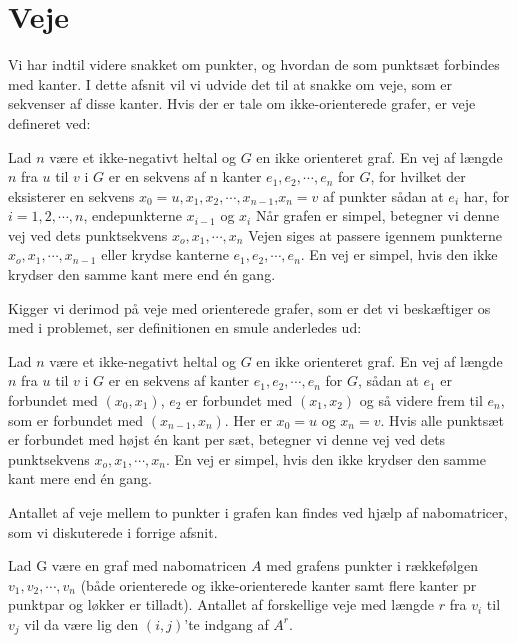 \section{Veje}
Vi har indtil videre snakket om punkter, og hvordan de som punktsæt forbindes med kanter. I dette afsnit vil vi udvide det til at snakke om veje, som er sekvenser af disse kanter. Hvis der er tale om ikke-orienterede grafer, er veje defineret ved:
\begin{defn}
[Veje] 
Lad $n$ være et ikke-negativt heltal og $G$ en ikke orienteret graf. En vej af længde $n$ fra $u$ til $v$ i $G$ er en sekvens af n kanter $e_{1},e_{2},\cdots,e_{n}$ for $G$, for hvilket der eksisterer en sekvens $x_{0}=u,x_{1},x_{2},\cdots,x_{n-1}$,$x_{n}=v$ af punkter sådan at $e_{i}$ har, for $i=1,2,\cdots,n$, endepunkterne $x_{i-1}$ og $x_{i}$ Når grafen er simpel, betegner vi denne  vej ved dets punktsekvens $x_{o},x_{1},\cdots,x_{n}$ Vejen siges at passere igennem punkterne $x_{o},x_{1},\cdots,x_{n-1}$ eller krydse kanterne $e_{1},e_{2},\cdots,e_{n}$. En vej er simpel, hvis den ikke krydser den samme kant mere end én gang.
\end{defn}
Kigger vi derimod på veje med orienterede grafer, som er det vi beskæftiger os med i problemet, ser definitionen en smule anderledes ud:
\begin{defn}
[Veje] 
Lad $n$ være et ikke-negativt heltal og $G$ en ikke orienteret graf. En vej af længde $n$ fra $u$ til $v$ i $G$ er en sekvens af kanter $e_{1},e_{2},\cdots,e_{n}$ for $G$, sådan at $e_{1}$ er forbundet med $(x_{0},x_{1})$, $e_{2}$ er forbundet med $(x_{1},x_{2})$ og så videre frem til $e_{n}$, som er forbundet med $(x_{n-1},x_{n})$. Her er $x_{0}=u$ og $x_{n}=v$. Hvis alle punktsæt er forbundet med højst én kant per sæt, betegner vi denne  vej ved dets punktsekvens $x_{o},x_{1},\cdots,x_{n}$. En vej er simpel, hvis den ikke krydser den samme kant mere end én gang.
\end{defn}

Antallet af veje mellem to punkter i grafen kan findes ved hjælp af nabomatricer, som vi diskuterede i forrige afsnit.
\begin{thm}
Lad G være en graf med nabomatricen
\textbf{$A$} med grafens punkter i rækkefølgen $v_{1},v_{2},\cdots,v_{n}$ (både orienterede og ikke-orienterede kanter samt flere kanter pr punktpar og løkker er tilladt). Antallet af forskellige veje med længde $r$ fra $v_{i}$ til $v_{j}$ vil da være lig den $(i,j)$'te indgang af \textbf{$A^{r}$}.
\end{thm}

